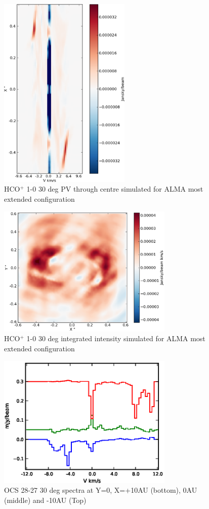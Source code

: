 \documentclass[useAMS,usenatbib]{mn2e}
\begin{document}
\begin{figure}
 \includegraphics[width=63mm]{Figures/sim/casa_imageHCOp_1-0_30deg_composite_ALMAwidth_dirty_PV_centre.eps}

 \caption{HCO$^+$ 1-0 30 deg PV through centre simulated for ALMA most extended configuration}
\end{figure}

\begin{figure}
 \includegraphics[width=84mm]{Figures/sim/casa_imageHCOp_1-0_30deg_composite_ALMAwidth_dirty_contSub.eps}

 \caption{HCO$^+$ 1-0 30 deg integrated intensity simulated for ALMA most extended configuration}
\end{figure}

\begin{figure}
 \includegraphics[width=84mm]{Figures/sim/casa_OCS_spectra_10AUsplit.eps}

 \caption{OCS 28-27 30 deg spectra at Y=0, X=+10AU (bottom), 0AU (middle) and -10AU (Top)}
\end{figure}
\end{document}
